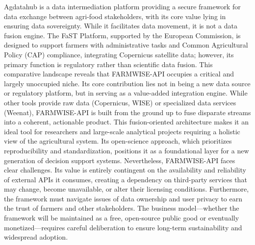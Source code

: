 \documentclass[preprint,12pt,authoryear]{elsarticle}
\begin{document}
Agdatahub is a data intermediation platform providing a secure framework for data exchange between agri-food stakeholders, with its core value lying in ensuring data sovereignty. While it facilitates data movement, it is not a data fusion engine. The FaST Platform, supported by the European Commission, is designed to support farmers with administrative tasks and Common Agricultural Policy (CAP) compliance, integrating Copernicus satellite data; however, its primary function is regulatory rather than scientific data fusion.
This comparative landscape reveals that FARMWISE-API occupies a critical and largely unoccupied niche. Its core contribution lies not in being a new data source or regulatory platform, but in serving as a value-added integration engine. While other tools provide raw data (Copernicus, WISE) or specialized data services (Weenat), FARMWISE-API is built from the ground up to fuse disparate streams into a coherent, actionable product. This fusion-oriented architecture makes it an ideal tool for researchers and large-scale analytical projects requiring a holistic view of the agricultural system. Its open-science approach, which prioritizes reproducibility and standardization, positions it as a foundational layer for a new generation of decision support systems.
Nevertheless, FARMWISE-API faces clear challenges. Its value is entirely contingent on the availability and reliability of external APIs it consumes, creating a dependency on third-party services that may change, become unavailable, or alter their licensing conditions. Furthermore, the framework must navigate issues of data ownership and user privacy to earn the trust of farmers and other stakeholders. The business model—whether the framework will be maintained as a free, open-source public good or eventually monetized—requires careful deliberation to ensure long-term sustainability and widespread adoption.
\end{document}
